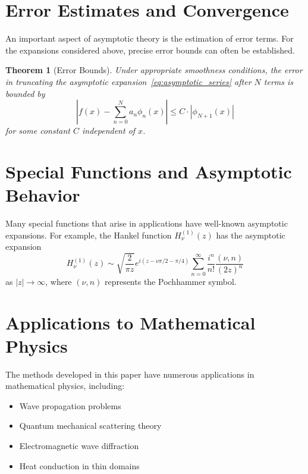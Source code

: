 \documentclass[11pt]{article}
\newtheorem{theorem}{Theorem}[section]
\begin{document}
\section{Error Estimates and Convergence}\label{sec:error_estimates}

An important aspect of asymptotic theory is the estimation of error terms. For the expansions considered above, precise error bounds can often be established.

\begin{theorem}[Error Bounds]\label{thm:error_bounds}
Under appropriate smoothness conditions, the error in truncating the asymptotic expansion~\eqref{eq:asymptotic_series} after $N$ terms is bounded by
\begin{equation}\label{eq:error_bound}
\left|f(x) - \sum_{n=0}^{N} a_n \phi_n(x)\right| \leq C \cdot |\phi_{N+1}(x)|
\end{equation}
for some constant $C$ independent of $x$.
\end{theorem}

\section{Special Functions and Asymptotic Behavior}\label{sec:special_functions}

Many special functions that arise in applications have well-known asymptotic expansions. For example, the Hankel function $H_\nu^{(1)}(z)$ has the asymptotic expansion
\begin{equation}\label{eq:hankel_asymptotic}
H_\nu^{(1)}(z) \sim \sqrt{\frac{2}{\pi z}} e^{i(z - \nu\pi/2 - \pi/4)} \sum_{n=0}^{\infty} \frac{i^n}{n!} \frac{(\nu, n)}{(2z)^n}
\end{equation}
as $|z| \to \infty$, where $(\nu, n)$ represents the Pochhammer symbol.

\section{Applications to Mathematical Physics}\label{sec:mathematical_physics}

The methods developed in this paper have numerous applications in mathematical physics, including:

\begin{itemize}
\item Wave propagation problems
\item Quantum mechanical scattering theory  
\item Electromagnetic wave diffraction
\item Heat conduction in thin domains
\end{itemize}
\end{document}
